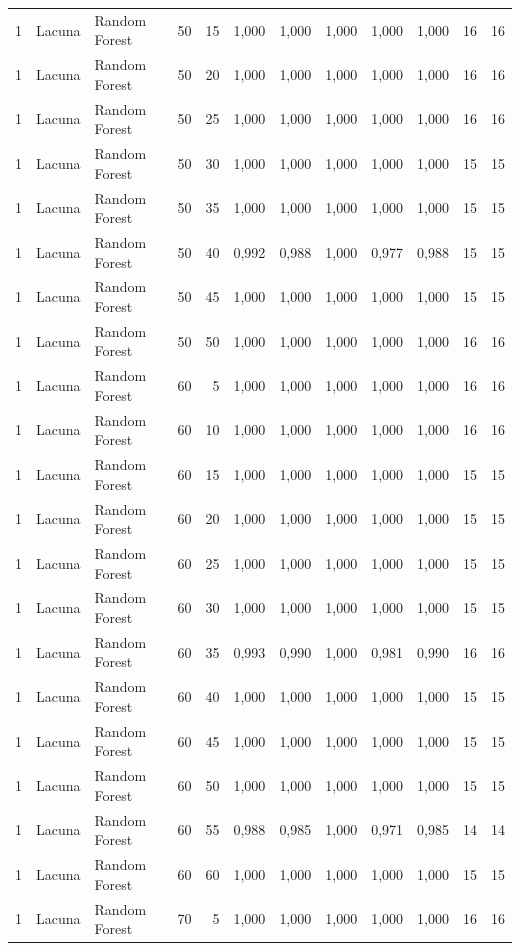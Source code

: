 \begin{longtable}{@{}rllrrrrrrrrr@{}}
1 & Lacuna & Random Forest & 50 & 15 & 1,000 & 1,000 & 1,000 & 1,000 & 1,000 & 16 & 16 \\
1 & Lacuna & Random Forest & 50 & 20 & 1,000 & 1,000 & 1,000 & 1,000 & 1,000 & 16 & 16 \\
1 & Lacuna & Random Forest & 50 & 25 & 1,000 & 1,000 & 1,000 & 1,000 & 1,000 & 16 & 16 \\
1 & Lacuna & Random Forest & 50 & 30 & 1,000 & 1,000 & 1,000 & 1,000 & 1,000 & 15 & 15 \\
1 & Lacuna & Random Forest & 50 & 35 & 1,000 & 1,000 & 1,000 & 1,000 & 1,000 & 15 & 15 \\
1 & Lacuna & Random Forest & 50 & 40 & 0,992 & 0,988 & 1,000 & 0,977 & 0,988 & 15 & 15 \\
1 & Lacuna & Random Forest & 50 & 45 & 1,000 & 1,000 & 1,000 & 1,000 & 1,000 & 15 & 15 \\
1 & Lacuna & Random Forest & 50 & 50 & 1,000 & 1,000 & 1,000 & 1,000 & 1,000 & 16 & 16 \\
1 & Lacuna & Random Forest & 60 & 5 & 1,000 & 1,000 & 1,000 & 1,000 & 1,000 & 16 & 16 \\
1 & Lacuna & Random Forest & 60 & 10 & 1,000 & 1,000 & 1,000 & 1,000 & 1,000 & 16 & 16 \\
1 & Lacuna & Random Forest & 60 & 15 & 1,000 & 1,000 & 1,000 & 1,000 & 1,000 & 15 & 15 \\
1 & Lacuna & Random Forest & 60 & 20 & 1,000 & 1,000 & 1,000 & 1,000 & 1,000 & 15 & 15 \\
1 & Lacuna & Random Forest & 60 & 25 & 1,000 & 1,000 & 1,000 & 1,000 & 1,000 & 15 & 15 \\
1 & Lacuna & Random Forest & 60 & 30 & 1,000 & 1,000 & 1,000 & 1,000 & 1,000 & 15 & 15 \\
1 & Lacuna & Random Forest & 60 & 35 & 0,993 & 0,990 & 1,000 & 0,981 & 0,990 & 16 & 16 \\
1 & Lacuna & Random Forest & 60 & 40 & 1,000 & 1,000 & 1,000 & 1,000 & 1,000 & 15 & 15 \\
1 & Lacuna & Random Forest & 60 & 45 & 1,000 & 1,000 & 1,000 & 1,000 & 1,000 & 15 & 15 \\
1 & Lacuna & Random Forest & 60 & 50 & 1,000 & 1,000 & 1,000 & 1,000 & 1,000 & 15 & 15 \\
1 & Lacuna & Random Forest & 60 & 55 & 0,988 & 0,985 & 1,000 & 0,971 & 0,985 & 14 & 14 \\
1 & Lacuna & Random Forest & 60 & 60 & 1,000 & 1,000 & 1,000 & 1,000 & 1,000 & 15 & 15 \\
1 & Lacuna & Random Forest & 70 & 5 & 1,000 & 1,000 & 1,000 & 1,000 & 1,000 & 16 & 16 \\

\end{longtable}
